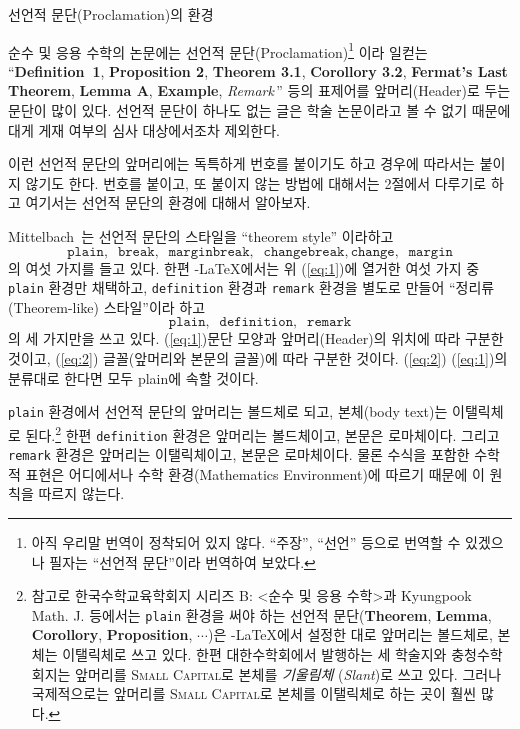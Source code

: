 \documentclass[a4paper,10pt]{amsproc}
\makeatletter
\let\gt\sffamily
\newcommand\env[1]{\texttt{#1}}
\def\section{\@startsection{section}{1}%
  \z@{1.5\linespacing\@plus\linespacing}{1.2\linespacing}%
  {\large\sffamily\scshape\centering}}           %
\makeatother
\begin{document}
\section{선언적 문단(Proclamation)의 환경}                             %

순수 및 응용 수학의 논문에는 선언적 문단(Proclamation)\footnote{\label{a1}%
  아직 우리말 번역이 정착되어 있지 않다. ``주장'', ``선언'' 등으로 번역할
  수 있겠으나 필자는 ``선언적 문단''이라 번역하여 보았다.}%
이라 일컫는 ``\textbf{Definition~1}, \textbf{Proposition 2}, \textbf{Theorem 3.1},
\textbf{Corollory 3.2}, \textbf{Fermat's Last Theorem}, \textbf{Lemma
  A}, \textbf{Example}, \textit{Remark}\,'' 등의 표제어를
앞머리(Header)로 두는 문단이 많이 있다. 선언적 문단이 하나도 없는 글은
학술 논문이라고 볼 수 없기 때문에 대게 게재 여부의 심사 대상에서조차 제외한다.  %

이런 선언적 문단의 앞머리에는 독특하게 번호를 붙이기도 하고 경우에
따라서는 붙이지 않기도 한다. 번호를 붙이고, 또 붙이지 않는 방법에
대해서는 2절에서 다루기로 하고 여기서는 선언적 문단의 환경에 대해서
알아보자.

Mittelbach~\cite[p.~3]{mi}는 선언적 문단의 스타일을 ``theorem style''
이라하고
\begin{equation*}\label{eq:1}
  \texttt{plain},\;\;\texttt{break},\;\;\texttt{marginbreak},\;\;\texttt{changebreak},
  \texttt{change},\;\;\texttt{margin}        \tag{$\ast$}
\end{equation*}
의 여섯 가지를 들고 있다. 한편 \AmS-\LaTeX 에서는 위
(\ref{eq:1})에 열거한 여섯 가지 중 \env{plain} 환경만 채택하고,
\env{definition} 환경과 \env{remark} 환경을 별도로 만들어
``정리류(Theorem-like) 스타일''이라 하고
\begin{equation*}\label{eq:2}
 \env{plain},\;\;\env{definition},\;\;\env{remark}     \tag{$\ast\ast$}
\end{equation*}
\noindent 의 세 가지만을 쓰고 있다. (\ref{eq:1})\는 문단 모양과
앞머리(Header)의 위치에 따라 구분한 것이고, (\ref{eq:2})\는
글꼴(앞머리와 본문의 글꼴)에 따라 구분한 것이다. (\ref{eq:2})\를
(\ref{eq:1})의 분류대로 한다면 모두 plain에 속할 것이다.

\env{plain} 환경에서 선언적 문단의 앞머리는 볼드체로 되고,
본체(body text)는 이탤릭체로 된다.\footnote{\label{a2}%
  참고로 한국수학교육학회지 시리즈 B: <순수 및 응용 수학>과
  Kyungpook Math. J. 등에서는 \env{plain} 환경을 써야 하는 선언적
  문단(\textbf{Theorem}, \textbf{Lemma}, \textbf{Corollory},
  \textbf{Proposition}, $\cdots$)은 \AmS-\LaTeX 에서 설정한 대로
  앞머리는 볼드체로, 본체는 이탤릭체로 쓰고 있다. 한편 대한수학회에서
  발행하는 세 학술지와 충청수학회지는 앞머리를 \textsc{Small Capital}로
  본체를 \textsl{기울림체} (\textsl{Slant})로 쓰고 있다. 그러나 국제적으로는
  앞머리를 \textsc{Small Capital}로 본체를 이탤릭체로 하는 곳이 훨씬
  많다.}
한편 \env{definition} 환경은 앞머리는 볼드체이고, 본문은
로마체이다. 그리고 \env{remark} 환경은 앞머리는 이탤릭체이고, 본문은
로마체이다. 물론 수식을 포함한 수학적 표현은 어디에서나 수학
환경(Mathematics Environment)에 따르기 때문에 이 원칙을 따르지 않는다.
\end{document}
